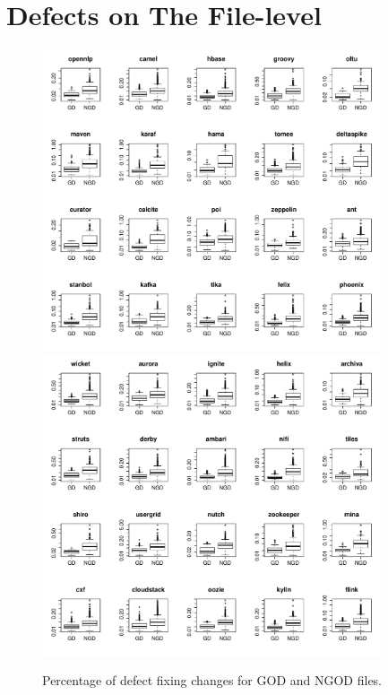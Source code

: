 \chapter{Defects on The File-level}

\begin{figure}[tb]
	\centering
	\includegraphics[width=100mm]{figures/chapter4/RQ1_boxplots_god_1}
	\includegraphics[width=100mm]{figures/chapter4/RQ1_boxplots_god_2}
	\caption{Percentage of defect fixing changes for GOD and NGOD files.}
	\label{figure:percentage_of_defects_god_vs_ngod}
\end{figure}



